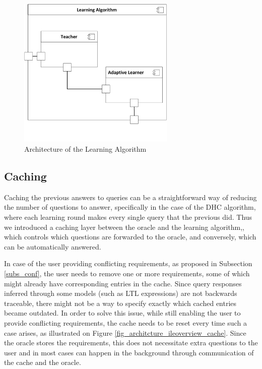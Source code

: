 \begin{figure}[!ht] 
	\centering
	\includegraphics[width=75mm, keepaspectratio]{figures/architecture_learningalgo.png}
	\caption{Architecture of the Learning Algorithm} 
	\label{fig_architcture_learningalgo}
\end{figure}
\subsection{Caching} \label{subs_cachingintheframework}
Caching the previous answers to queries can be a straightforward way of reducing the number of questions to answer, specifically in the case of the DHC algorithm, where each learning round makes every single query that the previous did. Thus we introduced a caching layer between the oracle and the learning algorithm,, which controls which questions are forwarded to the oracle, and conversely, which can be automatically answered.

In case of the user providing conflicting requirements, as proposed in Subsection \ref{subs_conf}, the user needs to remove one or more requirements, some of which might already have corresponding entries in the cache. Since query responses inferred through some models (such as LTL expressions) are not backwards traceable, there might not be a way to specify exactly which cached entries became outdated. In order to solve this issue, while still enabling the user to provide conflicting requirements, the cache needs to be reset every time such a case arises, as illustrated on Figure \ref{fig_architcture_ileoverview_cache}. Since the oracle stores the requirements, this does not necessitate extra questions to the user and in most cases can happen in the background through communication of the cache and the oracle.


